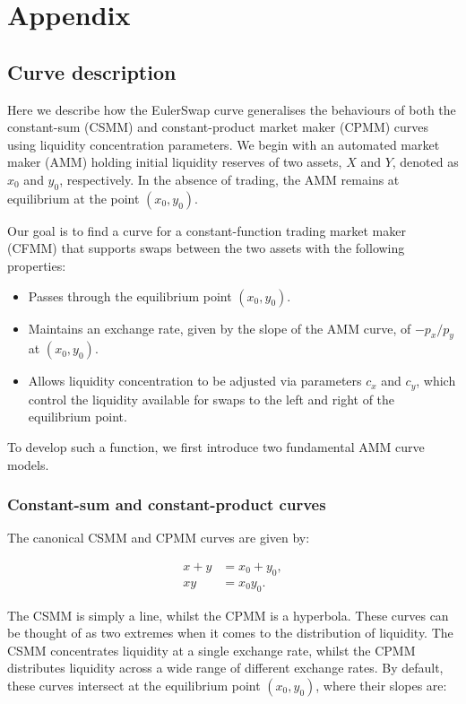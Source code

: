 \documentclass{article}
\begin{document}
\printbibliography

\newpage
\section{Appendix}
\label{sec:appendix}

\subsection{Curve description}
\label{sec:curve-description}

Here we describe how the EulerSwap curve generalises the behaviours of both the constant-sum (CSMM) and constant-product market maker (CPMM) curves using liquidity concentration parameters. We begin with an automated market maker (AMM) holding initial liquidity reserves of two assets, $X$ and $Y$, denoted as $x_0$ and $y_0$, respectively. In the absence of trading, the AMM remains at equilibrium at the point $(x_0, y_0)$. 

Our goal is to find a curve for a constant-function trading market maker (CFMM) that supports swaps between the two assets with the following properties:

\begin{itemize}
    \item Passes through the equilibrium point $(x_0, y_0)$.
    \item Maintains an exchange rate, given by the slope of the AMM curve, of $-p_x / p_y$ at $(x_0, y_0)$.
    \item Allows liquidity concentration to be adjusted via parameters $c_x$ and $c_y$, which control the liquidity available for swaps to the left and right of the equilibrium point.
\end{itemize}

To develop such a function, we first introduce two fundamental AMM curve models.

\subsubsection{Constant-sum and constant-product curves}

The canonical CSMM and CPMM curves are given by:

\begin{align}
    x + y &= x_0 + y_0, \\
    xy &= x_0 y_0.
\end{align}

The CSMM is simply a line, whilst the CPMM is a hyperbola. These curves can be thought of as two extremes when it comes to the distribution of liquidity. The CSMM concentrates liquidity at a single exchange rate, whilst the CPMM distributes liquidity across a wide range of different exchange rates. By default, these curves intersect at the equilibrium point $(x_0, y_0)$, where their slopes are:
\end{document}
